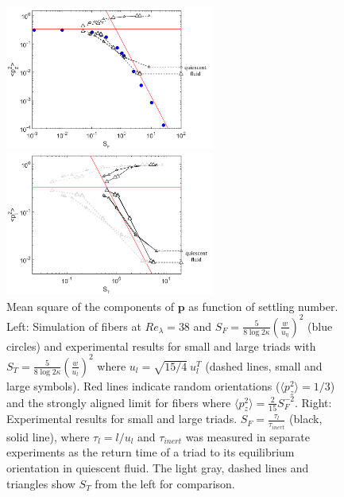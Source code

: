 \documentclass[]{jfm}
\begin{document}
\begin{figure}
\centering
\begin{minipage}{.5\textwidth}
  \centering
  \includegraphics[width=2.7in]{figures/SF_theory.pdf}
\end{minipage}%
\begin{minipage}{.5\textwidth}
  \centering
  \includegraphics[width=2.7in]{figures/SF_experiments.pdf}
\end{minipage}
  \caption{Mean square of the components of $\mathbf{p}$ as function of settling number. Left: Simulation of fibers at $\textit{Re}_{\lambda}{=}38$ and $S_F{=}\frac{5}{8\log{2\kappa}}(\frac{w}{u_{\eta}})^2$ (blue circles) and experimental results for small and large triads with $S_T{=}\frac{5}{8\log{2\kappa}}(\frac{w}{u_{l}})^2$ where $u_l{=}\sqrt{15/4}~u_l^T$ (dashed lines, small and large symbols).  Red lines indicate random orientations ($\langle p_z^2\rangle=1/3$) and the strongly aligned limit for fibers where $\langle p_z^2\rangle=\frac{2}{15}S_F^{-2}$.  Right: Experimental results for small and large triads.  $S_F{=}\frac{\tau_l}{\tau_{\textit{inert}}}$ (black, solid line), where $\tau_l{=}l/u_l$ and $\tau_{\textit{inert}}$ was measured in separate experiments as the return time of a triad to its equilibrium orientation in quiescent fluid. The light gray, dashed lines and triangles show $S_T$ from the left for comparison.}
\label{Fig:mean-square}
\end{figure}
\end{document}
